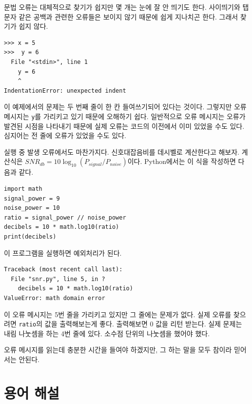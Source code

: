 \documentclass[10pt]{book}
\begin{document}
문법 오류는 대체적으로 찾기가 쉽지만 몇 개는 눈에 잘 안 띄기도 한다.
사이띄기와 탭 문자 같은 공백과 관련한 오류들은 보이지 않기 때문에 쉽게
지나치곤 한다.  그래서 찾기가 쉽지 않다.

\begin{verbatim}
>>> x = 5
>>>  y = 6
  File "<stdin>", line 1
    y = 6
    ^
IndentationError: unexpected indent
\end{verbatim}
%
이 예제에서의 문제는 두 번째 줄이 한 칸 들여쓰기되어 있다는 것이다.
그렇지만 오류 메시지는 {\tt y}를 가리키고 있기 때문에 오해하기 쉽다.
일반적으로 오류 메시지는 오류가 발견된 시점을 나타내기 때문에 실제
오류는 코드의 이전에서 이미 있었을 수도 있다.  심지어는 전 줄에 오류가
있었을 수도 있다.

실행 중 발생 오류에서도 마찬가지다.  신호대잡음비를 데시벨로 계산한다고 해보자.  계산식은 $SNR_{db} = 10 \log_{10} (P_{signal} / P_{noise})$이다.  Python에서는 이 식을 작성하면 다음과 같다. 

\begin{verbatim}
import math
signal_power = 9
noise_power = 10
ratio = signal_power // noise_power
decibels = 10 * math.log10(ratio)
print(decibels)
\end{verbatim}
%
이 프로그램을 실행하면 예외처리가 된다. 
%

\begin{verbatim}
Traceback (most recent call last):
  File "snr.py", line 5, in ?
    decibels = 10 * math.log10(ratio)
ValueError: math domain error
\end{verbatim}
%
이 오류 메시지는 5번 줄을 가리키고 있지만 그 줄에는 문제가 없다.  실제
오류를 찾으려면 {\tt ratio}의 값을 출력해보는게 좋다.  출력해보면 0
값을 리턴 받는다.  실제 문제는 내림 나눗셈을 하는 4번 줄에 있다.
소수점 단위의 나눗셈을 했어야 했다.

오류 메시지를 읽는데 충분한 시간을 들여야 하겠지만, 그 하는 말을 모두
참이라 믿어서는 안된다.


\section{용어 해설}
\end{document}
